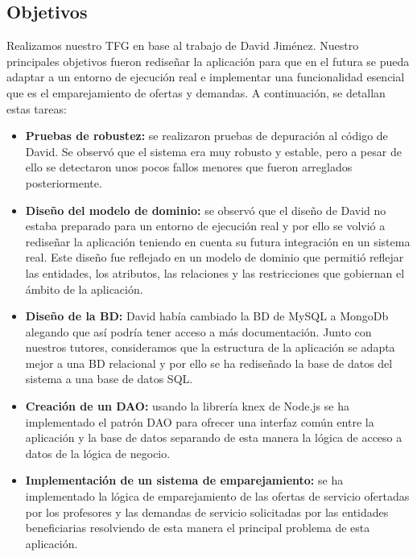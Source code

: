 \documentclass{article}
\begin{document}
\subsection{Objetivos}
Realizamos nuestro TFG en base al trabajo de David Jiménez.
Nuestro principales objetivos fueron rediseñar la aplicación para que en el futura se pueda adaptar a un entorno de ejecución real e implementar una funcionalidad esencial que es el emparejamiento de ofertas y demandas.
A continuación, se detallan estas tareas:
\begin{itemize}
\item \textbf{Pruebas de robustez:} se realizaron pruebas de depuración al código de David. Se observó que el sistema era muy robusto y estable, pero a pesar de ello se detectaron unos pocos fallos menores que fueron arreglados posteriormente.
\item \textbf{Diseño del modelo de dominio:} se observó que el diseño de David no estaba preparado para un entorno de ejecución real y por ello se volvió a rediseñar la aplicación teniendo en cuenta su futura integración en un sistema real. Este diseño fue reflejado en un modelo de dominio que permitió reflejar las entidades, los atributos, las relaciones y las restricciones que gobiernan el ámbito de la aplicación.
\item \textbf{Diseño de la BD:} David había cambiado la BD de MySQL a MongoDb alegando que así podría tener acceso a más documentación. Junto con nuestros tutores, consideramos que la estructura de la aplicación se adapta mejor a una BD relacional y por ello se ha rediseñado la base de datos del sistema a una base de datos SQL.
\item \textbf{Creación de un DAO:} usando la librería knex de Node.js se ha implementado el patrón DAO para ofrecer una interfaz común entre la aplicación y la base de datos separando de esta manera la lógica de acceso a datos de la lógica de negocio.
\item \textbf{Implementación de un sistema de emparejamiento:} se ha implementado la lógica de emparejamiento de las ofertas de servicio ofertadas por los profesores y las demandas de servicio solicitadas por las entidades beneficiarias resolviendo de esta manera el principal problema de esta aplicación.
\end{itemize}




\end{document}
